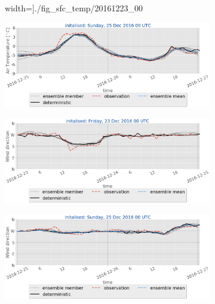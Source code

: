 \begin{figure}[h!]
\begin{subfigure}[b]{0.49\textwidth}
    width=\textwidth]{./fig_sfc_temp/20161223_00}
    	\caption{}\label{fig:res:sfc_temp23}
    \end{subfigure}
    \begin{subfigure}[b]{0.49\textwidth}
    	\includegraphics[trim={0.cm 3.6cm 0cm 0cm},clip,
    width=\textwidth]{./fig_sfc_temp/20161225_00}
    	\caption{}\label{fig:res:sfc_temp25}
    \end{subfigure}
    \begin{subfigure}[b]{0.49\textwidth}
    	\includegraphics[trim={0.cm 3.6cm 0cm 0cm},clip,
    width=\textwidth]{./fig_sfc_wd/20161223_00}
    	\caption{}\label{fig:res:sfc_wd23}
    \end{subfigure}
    \begin{subfigure}[b]{0.49\textwidth}
    	\includegraphics[trim={0.cm 3.6cm 0cm 0cm},clip,
    width=\textwidth]{./fig_sfc_wd/20161225_00}
    	\caption{}\label{fig:res:sfc_wd25}

\end{subfigure}
\end{figure}
